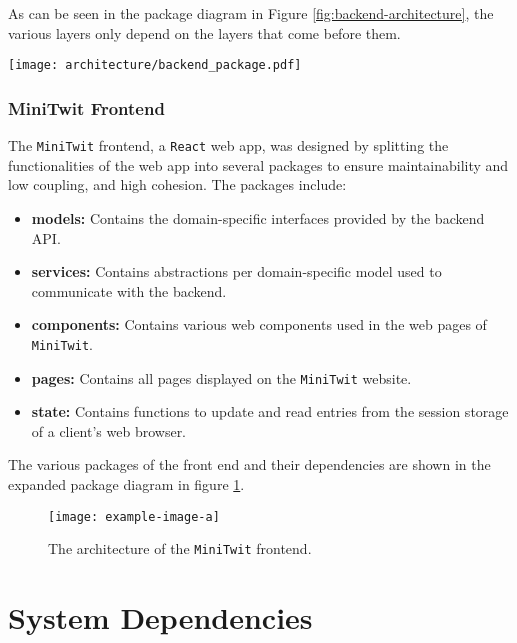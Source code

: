 As can be seen in the package diagram in Figure \ref{fig:backend-architecture}, the various layers only depend on the layers that come before them.

\begin{sidewaysfigure}[H]
    \centering
    \texttt{[image: architecture/backend\_package.pdf]}
    \caption{Package diagram showing the contents of the various components of the \texttt{MiniTwit} backend.}
    \label{fig:backend-architecture}
\end{sidewaysfigure}

\subsubsection{MiniTwit Frontend}

The \texttt{MiniTwit} frontend, a \texttt{React} web app, was designed by splitting the functionalities of the web app into several packages to ensure maintainability and low coupling, and high cohesion. The packages include:

\begin{itemize}
    \item \textbf{models:} Contains the domain-specific interfaces provided by the backend API.
    \item \textbf{services:} Contains abstractions per domain-specific model used to communicate with the backend.
    \item \textbf{components:} Contains various web components used in the web pages of \texttt{MiniTwit}.
    \item \textbf{pages:} Contains all pages displayed on the \texttt{MiniTwit} website.
    \item \textbf{state:} Contains functions to update and read entries from the session storage of a client's web browser.
\end{itemize}

The various packages of the front end and their dependencies are shown in the expanded package diagram in figure \ref{fig:frontend-architecture}.

\begin{figure}[H]
    \centering
    \texttt{[image: example-image-a]}
    \caption{The architecture of the \texttt{MiniTwit} frontend.}
    \label{fig:frontend-architecture}
\end{figure}

\section{System Dependencies}

